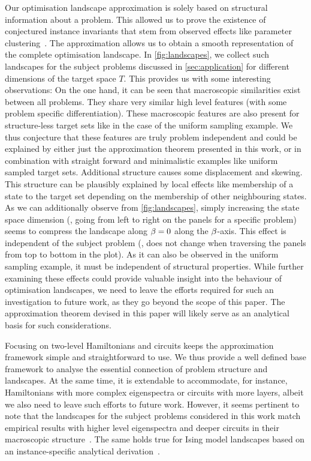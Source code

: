 Our optimisation landscape approximation is solely based on structural information about a problem. This allowed us to prove the existence of conjectured instance invariants that stem from observed effects like parameter clustering~\cite{brandao2018fixed,streif2020training}. The approximation allows us to obtain a smooth representation of the complete optimisation landscape. In \cref{fig:landscapes}, we collect such landscapes for the subject problems discussed in \cref{sec:application} for different dimensions of the target space $T$. This provides us with some interesting observations: On the one hand, it can be seen that macroscopic similarities exist between all problems. They share very similar high level features (with some problem specific differentiation). These macroscopic features are also present for structure-less target sets like in the case of the uniform sampling example. We thus conjecture that these features are truly problem independent and could be explained by either just the approximation theorem presented in this work, or in combination with straight forward and minimalistic examples like uniform sampled target sets. Additional structure causes some displacement and skewing. This structure can be plausibly explained by local effects like membership of a state to the target set depending on the membership of other neighbouring states. As we can additionally observe from \cref{fig:landscapes}, simply increasing the state space dimension (\ie, going from left to right on the panels for a specific problem) seems to compress the landscape along $\beta = 0$ along the $\beta$-axis. This effect is independent of the subject problem (\ie, does not change when traversing the panels from top to bottom in the plot). As it can also be observed in the uniform sampling example, it must be independent of structural properties. While further examining these effects could provide valuable insight into the behaviour of \QAOA optimisation landscapes, we need to leave the efforts required for such an investigation to future work, as they go beyond the scope of this paper. The approximation theorem devised in this paper will likely serve as an analytical basis for such considerations.

Focusing on two-level Hamiltonians and \QAOA circuits keeps the approximation framework simple and straightforward to use. We thus provide a well defined base framework to analyse the essential connection of problem structure and \QAOA landscapes. At the same time, it is extendable to accommodate, for instance, Hamiltonians with more complex eigenspectra or \QAOA circuits with more layers, albeit we also need to leave such efforts
to future work. However, it seems pertinent to note that the landscapes for the subject problems considered in this work match empirical results with higher level eigenspectra and deeper \QAOA circuits in their macroscopic
structure~\cite{pelofske2024short,streif2020training}. 
The same holds true for Ising model \QAOA landscapes based
on an instance-specific analytical derivation~\cite{Ozaeta:2022}.

